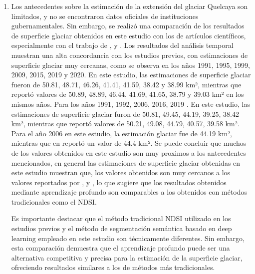\begin{enumerate}
	\item Los antecedentes sobre la estimación de la extensión del glaciar Quelcaya son limitados, y no se encontraron datos oficiales de instituciones gubernamentales. Sin embargo, se realizó una comparación de los resultados de superficie glaciar obtenidos en este estudio con los de artículos científicos, especialmente con el trabajo de \parencite{malone2022evolution}, \parencite{taylor2022multi} y \parencite{hanshaw2014glacial}. Los resultados del análisis temporal muestran una alta concordancia con los estudios previos, con estimaciones de superficie glaciar muy cercanas, como se observa en los años 1991, 1995, 1999, 2009, 2015, 2019 y 2020. En este estudio, las estimaciones de superficie glaciar fueron de 50.81, 48.71, 46.26, 41.41, 41.59, 38.42 y 38.99 km², mientras que \parencite{malone2022evolution} reportó valores de 50.89, 48.89, 46.44, 41.69, 41.65, 38.79 y 39.03 km² en los mismos años. Para los años 1991, 1992, 2006, 2016, 2019 . En este estudio, las estimaciones de superficie glaciar furon de 50.81, 49.45, 44.19, 39.25, 38.42 km², mientras que \parencite{taylor2022multi} reportó valores de 50.21, 49.08, 44.79, 40.57, 39.58 km². Para el año 2006 en este estudio, la estimación glaciar fue de 44.19 km², mientras que en \parencite{hanshaw2014glacial} reportó un valor de 44.4 km². Se puede concluir que muchos de los valores obtenidos en este estudio son muy proximos a los antecedentes mencionados, en general las estimaciones de superficie glaciar obtenidas en este estudio muestran que, los valores obtenidos son muy cercanos a los valores reportados por \parencite{malone2022evolution}, \parencite{taylor2022multi} y \parencite{hanshaw2014glacial}, lo que sugiere que los resultados obtenidos mediante aprendizaje profundo son comparables a los obtenidos con métodos tradicionales como el NDSI. 
	
	Es importante destacar que el método tradicional NDSI utilizado en los estudios previos y el método de segmentación semántica basado en deep learning empleado en este estudio son técnicamente diferentes. Sin embargo, esta comparación demuestra que el aprendizaje profundo puede ser una alternativa competitiva y precisa para la estimación de la superficie glaciar, ofreciendo resultados similares a los de métodos más tradicionales.
	
	
\end{enumerate}

\singlespacing